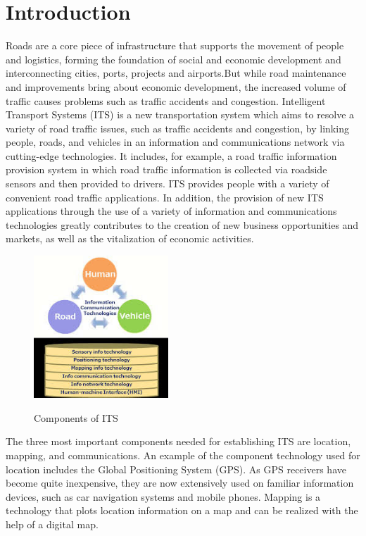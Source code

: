   \section{Introduction}

\hspace{2cm}Roads are a core piece of infrastructure that supports the movement of people and logistics, forming the foundation of social and economic development and interconnecting cities, ports, projects and airports.But while road maintenance and improvements bring about economic development, the increased volume of traffic causes problems such as traffic accidents and congestion.
Intelligent Transport Systems (ITS) is a new transportation system which aims to resolve a variety of road traffic issues, such as traffic accidents and congestion, by linking people, roads, and vehicles in an information and communications network via cutting-edge technologies. It includes, for example, a road traffic information provision system in which road traffic information is collected via roadside sensors and then provided to drivers. ITS provides people with a variety of convenient road traffic applications. In addition, the provision of new ITS applications through the use of a variety of information and communications technologies greatly contributes to the creation of new business opportunities and markets, as well as the vitalization of economic activities.

\begin{figure}[htp]%
    \center%
    \includegraphics[width=0.45\textwidth]{images/ch1/components.png}%
    \caption[Components of ITS]{Components of ITS}\cite{web001}\label{fig: Components of ITS}%
  \end{figure}
  
  \hspace{2cm}The three most important components needed for establishing ITS are location, mapping, and communications.
An example of the component technology used for location includes the Global Positioning System (GPS). As GPS receivers have become quite inexpensive, they are now extensively used on familiar information devices, such as car navigation systems and mobile phones.
Mapping is a technology that plots location information on a map and can be realized with the help of a digital map.\cite{web001}


